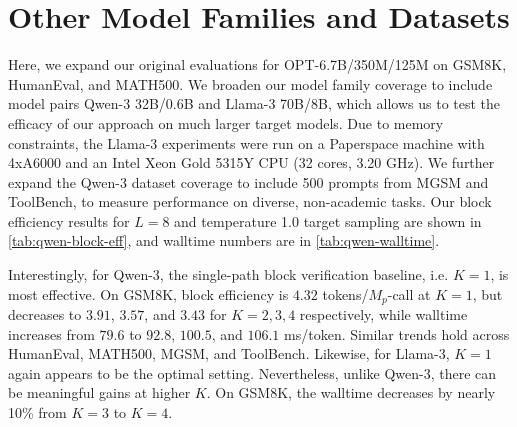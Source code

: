 \documentclass{article}
\theoremstyle{plain}
\theoremstyle{definition}
\theoremstyle{remark}
\begin{document}
\section{Other Model Families and Datasets}
\label{appendix:qwen-llama}

Here, we expand our original evaluations for OPT-6.7B/350M/125M on GSM8K, HumanEval, and MATH500. We broaden our model family coverage to include model pairs Qwen-3 32B/0.6B and Llama-3 70B/8B, which allows us to test the efficacy of our approach on much larger target models. Due to memory constraints, the Llama-3 experiments were run on a Paperspace machine with 4xA6000 and an Intel Xeon Gold 5315Y CPU (32 cores, 3.20 GHz). We further expand the Qwen-3 dataset coverage to include 500 prompts from MGSM and ToolBench, to measure performance on diverse, non-academic tasks. Our block efficiency results for $L=8$ and temperature 1.0 target sampling are shown in \cref{tab:qwen-block-eff}, and walltime numbers are in \cref{tab:qwen-walltime}.

Interestingly, for Qwen-3, the single-path block verification baseline, i.e. $K=1$, is most effective. On GSM8K, block efficiency is $4.32$ tokens/$M_p$-call at $K=1$, but decreases to $3.91$, $3.57$, and $3.43$ for $K=2,3,4$ respectively, while walltime increases from $79.6$ to $92.8$, $100.5$, and $106.1$ ms/token. Similar trends hold across HumanEval, MATH500, MGSM, and ToolBench. Likewise, for Llama-3, $K=1$ again appears to be the optimal setting. Nevertheless, unlike Qwen-3, there can be meaningful gains at higher $K$. On GSM8K, the walltime decreases by nearly 10\% from $K=3$ to $K=4$.
\end{document}

